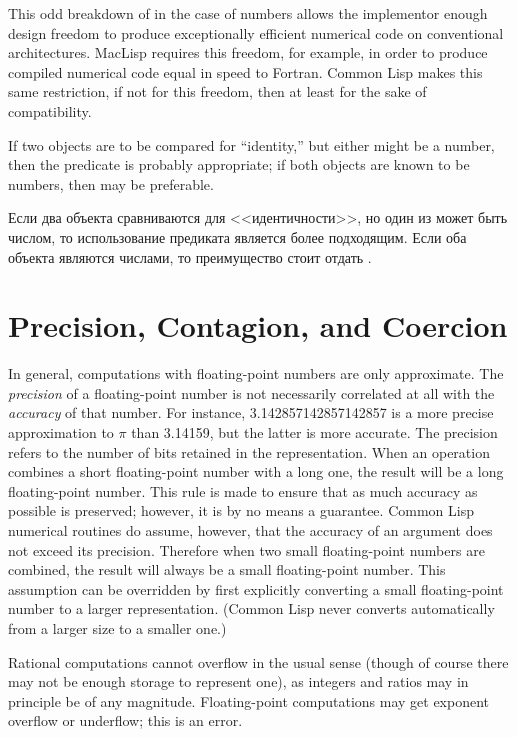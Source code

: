 \beforenoterule
\begin{rationale}
This odd breakdown of  in the case of numbers
allows the implementor enough design freedom to produce exceptionally
efficient numerical code on conventional architectures.
MacLisp requires this freedom, for example, in order to produce compiled
numerical code equal in speed to Fortran.
Common Lisp makes this same restriction,
if not for this freedom, then at least for the sake of compatibility.
\end{rationale}
\afternoterule

If two objects are to be compared for ``identity,'' but either might be
a number, then the predicate  is probably appropriate;
if both objects are known to be numbers, then \cdf{=}
may be preferable.

Если два объекта сравниваются для <<идентичности>>, но один из может быть
числом, то использование предиката  является более подходящим.
Если оба объекта являются числами, то преимущество стоит отдать \cdf{=}.

\section{Precision, Contagion, and Coercion}
\label{PRECISION-CONTAGION-COERCION-SECTION}

In general,
computations with floating-point numbers are only approximate.
The \emph{precision} of a floating-point number is not necessarily
correlated at all with the \emph{accuracy} of that number.
For instance, 3.142857142857142857 is a more precise approximation
to $\pi$ than 3.14159, but the latter is more accurate.
The precision refers to the number of bits retained in the representation.
When an operation combines a short floating-point number with a long one,
the result will be a long floating-point number.  This rule is made
to ensure that as much accuracy as possible is preserved; however,
it is by no means a guarantee.
Common Lisp numerical routines do assume, however, that the accuracy of
an argument does not exceed its precision.  Therefore
when two small floating-point numbers
are combined, the result will always be a small floating-point number.
This assumption can be overridden by first explicitly converting
a small floating-point number to a larger representation.
(Common Lisp never converts automatically from a larger size to a smaller one.)

Rational computations cannot overflow in the usual sense
(though of course there may not be enough storage
to represent one), as integers and ratios may in principle be of any magnitude.
Floating-point computations may get exponent overflow or underflow;
this is an error.

